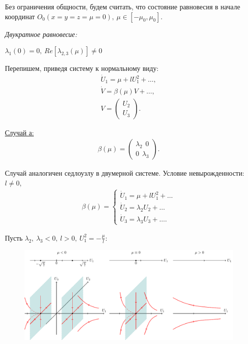 Без ограничения общности, будем считать, что состояние равновесия в начале координат $O_0(x=y=z=\mu=0),~\mu \in [-\mu_0,\mu_0]$.

\textit{Двукратное равновесие:}

$\lambda_1(0)=0,~Re[\lambda_{2,3}(\mu)] \neq 0$

Перепишем, приведя систему к нормальному виду:
\begin{gather*}
	\dot U_1 = \mu+lU_1^2+\dots, \\
	\dot V=\beta(\mu)V+\dots, \\
	V=
	\begin{pmatrix}
		U_2 \\
		U_3
	\end{pmatrix}
	.
\end{gather*}

\underline{Случай а:}
\begin{gather*}
	\beta(\mu)=
	\begin{pmatrix}
		\lambda_2~~0 \\
		0~~\lambda_3
	\end{pmatrix}
	.
\end{gather*}

Случай аналогичен седлоузлу в двумерной системе. Условие невырожденности: $l\neq 0$,
\begin{gather*}
	\beta(\mu)=
	\begin{cases}
		\dot U_1 = \mu+lU_1^2+\dots \\
		\dot U_2 = \lambda_2U_2+\dots \\
		\dot U_3 = \lambda_3U_3+\dots.
	\end{cases}
\end{gather*}

Пусть $\lambda_2,~\lambda_3<0,~l>0,~U_1^2=-\frac{\mu}{l}$:
\begin{figure}[H]
	\centering
	\includegraphics[width=1\linewidth]{fig/fig49.pdf}   
\end{figure}


